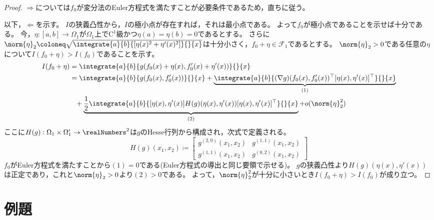             \begin{proof}
                $\Rightarrow$については$f_0$が変分法のEuler方程式を満たすことが必要条件であるため，直ちに従う。
                \par
                以下，$\Leftarrow$を示す。
                $I$の狭義凸性から，$I$の極小点が存在すれば，それは最小点である。
                よって$f_0$が極小点であることを示せば十分である。
                今，$\eta:[a,b]\to\Omega_1$が$\Omega_1$上で$\mathrm{C}^1$級かつ$\eta(a)=\eta(b)=0$であるとする。
                さらに$\norm{\eta}_2 \coloneq \sqrt{\integrate{a}{b}{[\eta(x)^2+\eta'(x)^2]}{}{x}}$は十分小さく，$f_0+\eta\in\mathcal{F}_1$であるとする。
                $\norm{\eta}_2>0$である任意の$\eta$について$I(f_0+\eta) > I(f_0)$であることを示す。
                \begin{align*}
                    I(f_0+\eta) &= \integrate{a}{b}{g(f_0(x)+\eta(x),f_0'(x)+\eta'(x))}{}{x} \\
                    &= \integrate{a}{b}{g(f_0(x),f_0'(x))}{}{x} + \underbrace{\integrate{a}{b}{(\nabla g)(f_0(x),f_0'(x))^\top[\eta(x),\eta'(x)]^\top}{}{x}}_{(1)} \\
                    &\phantom{=} + \underbrace{\frac{1}{2}\integrate{a}{b}{[\eta(x),\eta'(x)]H(g)(\eta(x),\eta'(x))[\eta(x),\eta'(x)]^\top}{}{x}}_{(2)} + o(\norm{\eta}_2^2)
                \end{align*}
                ここに$H(g):\Omega_1\times\Omega_1'\to\realNumbers^2$は$g$のHesse行列から構成され，次式で定義される。
                \[
                    H(g)(x_1,x_2) \coloneq
                    \begin{bmatrix}
                        g^{(2,0)}(x_1,x_2) & g^{(1,1)}(x_1,x_2) \\
                        g^{(1,1)}(x_1,x_2) & g^{(0,2)}(x_1,x_2)
                    \end{bmatrix}
                \]
                $f_0$がEuler方程式を満たすことから$(1)=0$である(Euler方程式の導出と同じ要領で示せる)。
                $g$の狭義凸性より$H(g)(\eta(x),\eta'(x))$は正定であり，これと$\norm{\eta}_2>0$より$(2)>0$である。
                よって，$\norm{\eta}_2^2$が十分に小さいとき$I(f_0+\eta) > I(f_0)$が成り立つ。
            \end{proof}
    \section{例題}
